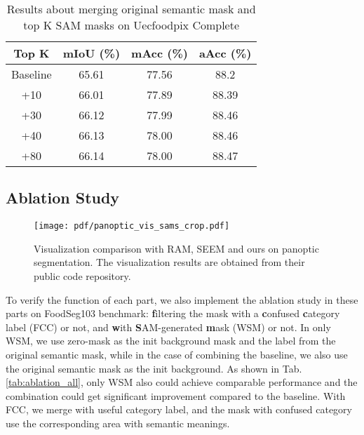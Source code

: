 \documentclass[lettersize,journal]{IEEEtran}
\begin{document}
\begin{table}
\centering
\caption{Results about merging original semantic mask and top K SAM masks on Uecfoodpix Complete}
\begin{tabular}{c|ccc}
\hline
\textbf{Top K}             & \textbf{mIoU (\%)} & \textbf{mAcc (\%)} & \textbf{aAcc (\%)} \\ \hline

Baseline   & 65.61         & 77.56         & 88.2         \\
+10 & 66.01         & 77.89         & 88.39         \\
+30 & 66.12         & 77.99         & 88.46 \\
+40 & 66.13         & 78.00         & 88.46         \\
+80 & 66.14         & 78.00         & 88.47         \\ \hline
\end{tabular}
\captionsetup{justification=centering}
\label{ablation: uec topk masks}
\end{table}
 
\subsection{Ablation Study}

\begin{figure*}[tbh]
\centering
\newpage
\texttt{[image: pdf/panoptic\_vis\_sams\_crop.pdf]}
\caption{Visualization comparison with RAM, SEEM and ours on panoptic segmentation. The visualization results are obtained from their public code repository.}
\label{fig: panoptic vis vs. sams}
\end{figure*}

To verify the function of each part, we also implement the ablation study in these parts on FoodSeg103 benchmark: \textbf{f}iltering the mask with a \textbf{c}onfused \textbf{c}ategory label (FCC) or not, and \textbf{w}ith \textbf{S}AM-generated \textbf{m}ask (WSM)  or not. 
In only WSM, we use zero-mask as the init background mask and the label from the original semantic mask, while in the case of combining the baseline, we also use the original semantic mask as the init background. 
As shown in Tab.\ref{tab:ablation_all}, only WSM also could achieve comparable performance and the combination could get significant improvement compared to the baseline. With FCC, we merge with useful category label, and the mask with confused category use the corresponding area with semantic meanings.
\end{document}
